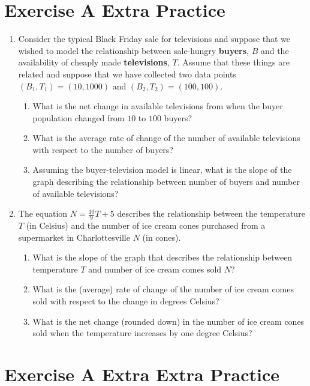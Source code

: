 \documentclass[12pt]{article}
\begin{document}
\thispagestyle{empty}


\section{Exercise A Extra Practice}

\begin{enumerate}

\item[(a)] Consider the typical Black Friday sale for televisions and suppose that we wished to model the relationship between sale-hungry \textbf{buyers}, $B$ and the availability of cheaply made \textbf{televisions}, $T$. Assume that these things are related and suppose that we have collected two data points $(B_1, T_1) = (10, 1000)$ and $(B_2, T_2) = (100, 100).$
    \begin{enumerate}
        \item[(i)] What is the net change in available televisions from when the buyer population changed from $10$ to $100$ buyers?
        \item[(ii)]What is the average rate of change of the number of available televisions with respect to the number of buyers?
        \item[(iii)]Assuming the buyer-television model is linear, what is the slope of the graph describing the relationship between number of buyers and number of available televisions?
    \end{enumerate}
\item[(b)] The equation $N = \frac{10}{9}T + 5$ describes the relationship between the temperature $T$ (in Celsius) and the number of ice cream cones purchased from a supermarket in Charlottesville $N$ (in cones).
    \begin{enumerate}
        \item[(i)] What is the slope of the graph that describes the relationship between temperature $T$ and number of ice cream comes sold $N?$
        \item[(ii)]What is the (average) rate of change of the number of ice cream comes sold with respect to the change in degrees Celsius?
        \item[(iii)] What is the net change (rounded down) in the number of ice cream cones sold when the temperature increases by one degree Celsius?
    \end{enumerate}

\end{enumerate}

\newpage
\section{Exercise A Extra Extra Practice}
\end{document}

